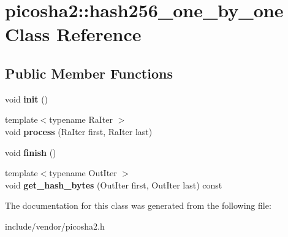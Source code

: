 \hypertarget{classpicosha2_1_1hash256__one__by__one}{}\section{picosha2\+:\+:hash256\+\_\+one\+\_\+by\+\_\+one Class Reference}
\label{classpicosha2_1_1hash256__one__by__one}
\subsection*{Public Member Functions}
\begin{DoxyCompactItemize}
\item 
\mbox{\label{classpicosha2_1_1hash256__one__by__one_a9308a2f22f9d0afbd315c9cf45458819}} 
void {\bfseries init} ()
\item 
\mbox{\label{classpicosha2_1_1hash256__one__by__one_a2ce5fc541a7c27a935eecb85b9dd6497}} 
{\footnotesize template$<$typename Ra\+Iter $>$ }\\void {\bfseries process} (Ra\+Iter first, Ra\+Iter last)
\item 
\mbox{\label{classpicosha2_1_1hash256__one__by__one_a1c2c4d24deccb590cbbd30ffeb317690}} 
void {\bfseries finish} ()
\item 
\mbox{\label{classpicosha2_1_1hash256__one__by__one_a3f9ac7afd9396f70f779cf7f99bfa4d9}} 
{\footnotesize template$<$typename Out\+Iter $>$ }\\void {\bfseries get\+\_\+hash\+\_\+bytes} (Out\+Iter first, Out\+Iter last) const
\end{DoxyCompactItemize}


The documentation for this class was generated from the following file\+:\begin{DoxyCompactItemize}
\item 
include/vendor/picosha2.\+h\end{DoxyCompactItemize}
